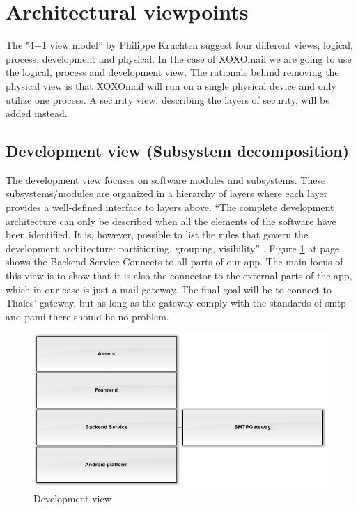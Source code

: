 \section{Architectural viewpoints}
The "4+1 view model'' \cite{bib:vm} by Philippe Kruchten suggest four different views, logical, process, development and physical. In the case of XOXOmail we are going to use the logical, process and development view. The rationale behind removing the physical view is that XOXOmail will run on a single physical device and only utilize one process. A security view, describing the layers of security, will be added instead.

\subsection{Development view (Subsystem decomposition)}
The development view focuses on software modules and subsystems. These subsystems/modules are organized in a hierarchy of layers where each layer provides a well-defined interface to layers above. 
\newline
\newline
``The complete development architecture can only be described when all the elements of the software have been identified. It is, however, possible to list the rules that govern the development architecture: partitioning, grouping, visibility'' \cite{bib:vm}. 
\newline
\newline
Figure \ref{fig:developmentview} at page \pageref{fig:developmentview} shows the Backend Service Connects to all parts of our app. The main focus of this view is to show that it is also the connector to the external parts of the app, which in our case is just a mail gateway. The final goal will be to connect to Thales' gateway, but as long as the gateway comply with the standards of \gls{smtp} and \gls{pami} there should be no problem.

\begin{figure}[H]
	\includegraphics[width=\textwidth]{developmentview.png}
	\caption{Development view}
	\label{fig:developmentview}
\end{figure}

